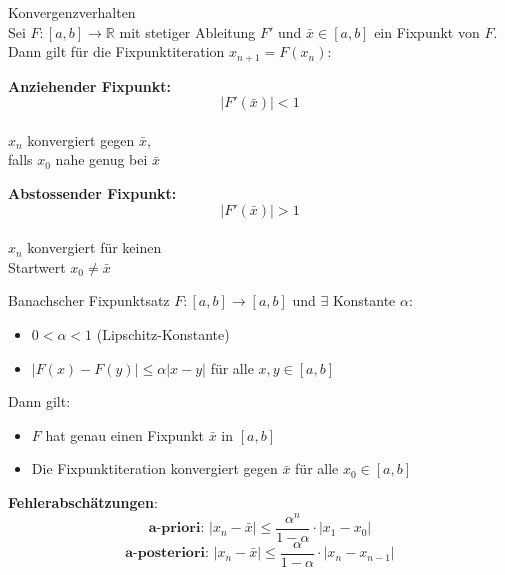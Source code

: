 \begin{theorem}{Konvergenzverhalten}\\
Sei $F:[a,b] \rightarrow \mathbb{R}$ mit stetiger Ableitung $F'$ und $\bar{x} \in [a,b]$ ein Fixpunkt von $F$. Dann gilt für die Fixpunktiteration $x_{n+1}=F(x_n)$:
\vspace{1mm}\\
\begin{minipage}[t]{0.45\textwidth}
    \textbf{Anziehender Fixpunkt:}
    \vspace{-3mm}\\
    $$|F'(\bar{x})| < 1$$
    \vspace{-4mm}\\
    $x_n$ konvergiert gegen $\bar{x}$,\\
    falls $x_0$ nahe genug bei $\bar{x}$
\end{minipage}
\hspace{3mm}
\begin{minipage}[t]{0.45\textwidth}
    \textbf{Abstossender Fixpunkt:}
    \vspace{-3mm}\\
    $$|F'(\bar{x})| > 1$$
    \vspace{-4mm}\\
    $x_n$ konvergiert für keinen\\
    Startwert $x_0 \neq \bar{x}$
\end{minipage}
\end{theorem}

\begin{lemma}{Banachscher Fixpunktsatz}
$F:[a,b] \rightarrow [a,b]$ und $\exists$ Konstante $\alpha$:
\begin{itemize}
    \item $0 < \alpha < 1$ (Lipschitz-Konstante)
    \item $|F(x)-F(y)| \leq \alpha|x-y|$ für alle $x,y \in [a,b]$
\end{itemize}
\vspace{2mm}


\begin{minipage}[t]{0.35\textwidth}
    Dann gilt:
\begin{itemize}
    \item $F$ hat genau einen Fixpunkt $\bar{x}$ in $[a,b]$
    \item Die Fixpunktiteration konvergiert gegen $\bar{x}$ für alle $x_0 \in [a,b]$
\end{itemize}
\end{minipage}
\hspace{2mm}
\begin{minipage}[t]{0.55\textwidth}
    \textbf{Fehlerabschätzungen}:
    \vspace{-2mm}\\
    $$\textbf{a-priori: } |x_n-\bar{x}| \leq \frac{\alpha^n}{1-\alpha} \cdot |x_1-x_0|$$
    $$\textbf{a-posteriori: } |x_n-\bar{x}| \leq \frac{\alpha}{1-\alpha} \cdot |x_n-x_{n-1}|$$
\end{minipage}
\end{lemma}

